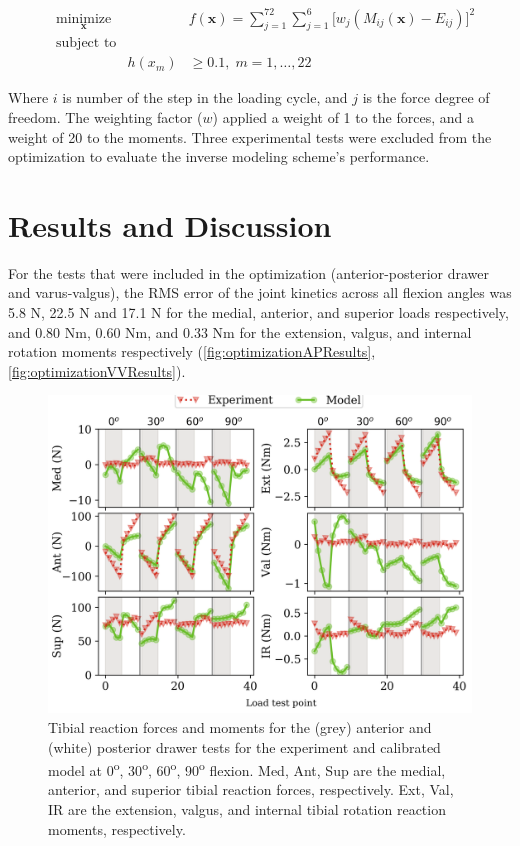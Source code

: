 \begin{equation}
    \begin{aligned}
    & \underset{\bm{x}}{\text{minimize}}
    & & f(\bm{x}) = \sum_{j=1}^{72}\sum_{j=1}^6 \big[w_j(M_{ij}(\bm{x}) - E_{ij})\big]^2 \\
    & \text{subject to} \\
    & & h(x_m) &\geq 0.1, \; m = 1, \ldots, 22
    \end{aligned}
    \label{eq:Optimization}
\end{equation}

Where $i$ is number of the step in the loading cycle, and $j$ is the force degree of freedom. The weighting factor ($w$) applied a weight of 1 to the forces, and a weight of 20 to the moments. Three experimental tests were excluded from the optimization to evaluate the inverse modeling scheme's performance. 

\section{Results and Discussion}
For the tests that were included in the optimization (anterior-posterior drawer and varus-valgus), the RMS error of the joint kinetics across all flexion angles was 5.8 N, 22.5 N and 17.1 N for the medial, anterior, and superior loads respectively, and 0.80 Nm, 0.60 Nm, and 0.33 Nm for the extension, valgus, and internal rotation moments respectively (\autoref{fig:optimizationAPResults}, \autoref{fig:optimizationVVResults}).

\begin{figure}
    \centering
    \includegraphics[width=0.80\linewidth]{../img/Spec1_AP_OptimizationResults_APVV_0_30_60_90.png}
    \caption{Tibial reaction forces and moments for the (grey) anterior and (white) posterior drawer tests for the experiment and calibrated model at 0\textsuperscript{o}, 30\textsuperscript{o}, 60\textsuperscript{o}, 90\textsuperscript{o} flexion. Med, Ant, Sup are the medial, anterior, and superior tibial reaction forces, respectively. Ext, Val, IR are the extension, valgus, and internal tibial rotation reaction moments, respectively.}
    \label{fig:optimizationAPResults}
\end{figure}

